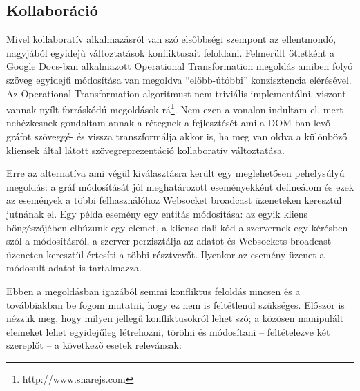 \subsection{Kollaboráció}

Mivel kollaboratív alkalmazásról van szó elsőbbségi szempont az ellentmondó, nagyjából egyidejű változtatások konfliktusait feloldani. Felmerült ötletként a Google Docs-ban alkalmazott Operational Transformation megoldás amiben folyó szöveg egyidejű módosítása van megoldva ``előbb-útóbbi'' konzisztencia elérésével. Az Operational Transformation algoritmust nem triviális implementálni, viszont vannak nyílt forráskódú megoldások rá\footnote{http://www.sharejs.com}. Nem ezen a vonalon indultam el, mert nehézkesnek gondoltam annak a rétegnek a fejlesztését ami a DOM-ban levő gráfot szöveggé- és vissza transzformálja akkor is, ha meg van oldva a különböző kliensek által látott szövegreprezentáció kollaboratív változtatása. 

Erre az alternatíva ami végül kiválasztásra került egy meglehetősen pehelysúlyú megoldás: a gráf módosítását jól meghatározott eseményekként defineálom és ezek az események a többi felhasználóhoz Websocket broadcast üzeneteken keresztül jutnának el. Egy példa esemény egy entitás módosítása: az egyik kliens böngészőjében elhúzunk egy elemet, a kliensoldali kód a szervernek egy kérésben szól a módosításról, a szerver perzisztálja az adatot és Websockets broadcast üzeneten keresztül értesíti a többi résztvevőt. Ilyenkor az esemény üzenet a módosult adatot is tartalmazza. 

Ebben a megoldásban igazából semmi konfliktus feloldás nincsen és a továbbiakban be fogom mutatni, hogy ez nem is feltétlenül szükséges. Először is nézzük meg, hogy milyen jellegű konfliktusokról lehet szó; a közösen manipulált elemeket lehet egyidejűleg létrehozni, törölni és módosítani -- feltételezve két szereplőt -- a következő esetek relevánsak:

